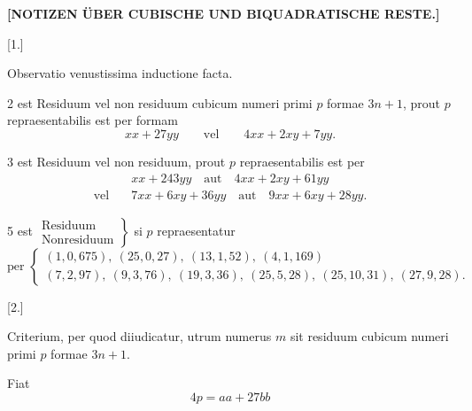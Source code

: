 \clearpage{}
\begin{center}\bfseries [NOTIZEN ÜBER CUBISCHE UND BIQUADRATISCHE RESTE.]\end{center}
\begin{center}[1.]\par\smallskip Observatio venustissima inductione facta.\end{center}
\noindent\hspace*{\parindent}2 est Residuum vel non residuum cubicum numeri primi $p$ formae $3n+1$, prout $p$ repraesentabilis est per formam
\[xx+27yy\qquad\text{vel}\qquad4xx+2xy+7yy.\]
\par\noindent\hspace*{\parindent}3 est Residuum vel non residuum, prout $p$ repraesentabilis est per
\[\begin{aligned} &xx+243yy\quad\text{aut}\quad4xx+2xy+61yy\\
\text{vel}\quad&7xx+6xy+36yy\quad\text{aut}\quad9xx+6xy+28yy.\end{aligned}\]
\par\noindent\hspace*{\parindent}5 est $\left.\begin{array}{l}\text{Residuum}\\\text{Nonresiduum}\end{array}\right\}$ si $p$ repraesentatur
\begingroup\small
\[\text{per }\left\{\begin{array}{l}(1,0,675),\ (25,0,27),\ (13,1,52),\ (4,1,169)\\
(7,2,97),\ (9,3,76),\ (19,3,36),\ (25,5,28),\ (25,10,31),\ (27,9,28).\end{array}\right.\]
\endgroup
\begin{center}[2.]\end{center}
\noindent\hspace*{\parindent}Criterium, per quod diiudicatur, utrum numerus $m$ sit residuum cubicum numeri primi $p$ formae $3n+1$.

Fiat
\[4p=aa+27bb\]
